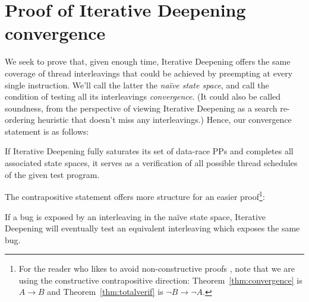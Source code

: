 \section{Proof of Iterative Deepening convergence}

We seek to prove that, given enough time, Iterative Deepening offers the same coverage of thread interleavings that could be achieved by preempting at every single instruction.
We'll call the latter the {\em na\"{i}ve state space}, and call the condition of testing all its interleavings {\em convergence}.
(It could also be called soundness, from the perspective of viewing Iterative Deepening as a search re-ordering heuristic that doesn't miss any interleavings.)
Hence, our convergence statement is as follows:

\begin{theorem}
	If Iterative Deepening fully saturates its set of data-race PPs and completes all associated state spaces,
	it serves as a verification of all possible thread schedules of the given test program.
	\label{thm:totalverif}
\end{theorem}

The contrapositive statement offers more structure for an easier proof\footnote{
For the reader who likes to avoid non-constructive proofs \cite{vargomax},
note that we are using the constructive contrapositive direction:
Theorem~\ref{thm:convergence} is $A \rightarrow B$ and Theorem~\ref{thm:totalverif} is $\neg B \rightarrow \neg A$.}:

\begin{theorem}
	If a bug is exposed by an interleaving in the na\"{i}ve state space, Iterative Deepening will eventually test an equivalent interleaving which exposes the same bug.
	\label{thm:convergence}
\end{theorem}


